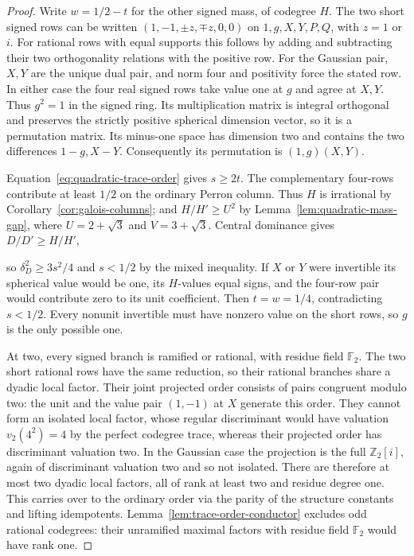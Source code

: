 \documentclass[11pt,reqno]{amsart}
\theoremstyle{remark}\newtheorem{remark}[theorem]{Remark}
\numberwithin{equation}{section}
\begin{document}
\begin{proof}
Write $w=1/2-t$ for the other signed mass, of codegree $H$.
The two short signed rows can be written
$(1,-1,\pm z,\mp z,0,0)$ on $1,g,X,Y,P,Q$, with $z=1$ or $i$.
For rational rows with equal supports this follows by adding and
subtracting their two orthogonality relations with the positive row.
For the Gaussian pair, $X,Y$ are the unique dual pair, and norm
four and positivity force the stated row. In either case the four
real signed rows take value one at $g$ and agree at $X,Y$. Thus
$g^2=1$ in the signed ring. Its multiplication matrix is integral
orthogonal and preserves the strictly positive spherical dimension
vector, so it is a permutation matrix. Its minus-one space has
dimension two and contains the two differences $1-g,X-Y$.
Consequently its permutation is $(1,g)(X,Y)$.

Equation~\eqref{eq:quadratic-trace-order} gives $s\ge2t$.
The complementary four-rows contribute at least $1/2$ on the
ordinary Perron column. Thus $H$ is irrational by
Corollary~\ref{cor:galois-columns}; and $H/H'\ge U^2$ by
Lemma~\ref{lem:quadratic-mass-gap}, where $U=2+\sqrt3$ and
$V=3+\sqrt3$. Central dominance gives $D/D'\ge H/H'$,

so $\delta_D^2\ge3s^2/4$ and
$s<1/2$ by the mixed inequality. If $X$ or $Y$ were invertible
its spherical value would be one, its $H$-values equal signs,
and the four-row pair would contribute zero to its unit coefficient.
Then $t=w=1/4$, contradicting $s<1/2$. Every nonunit invertible
must have nonzero value on the short rows, so $g$ is the only
possible one.

At two, every signed branch is ramified or rational, with residue
field $\mathbb F_2$. The two short rational rows have the same
reduction, so their rational branches share a dyadic local
factor. Their joint projected order consists of pairs congruent
modulo two: the unit and the value pair $(1,-1)$ at $X$ generate
this order. They cannot form an isolated local factor, whose
regular discriminant would have valuation $v_2(4^2)=4$ by the
perfect codegree trace, whereas their projected order has
discriminant valuation two. In the Gaussian case the projection
is the full $\mathbb Z_2[i]$, again of discriminant valuation
two and so not isolated. There are therefore at most two dyadic
local factors, all of rank at least two and residue degree one.
This carries over to the ordinary order via the parity of the
structure constants and lifting idempotents. Lemma~\ref{lem:trace-order-conductor} excludes odd rational
codegrees: their unramified maximal factors with residue field
$\mathbb F_2$ would have rank one.


\end{proof}
\end{document}
